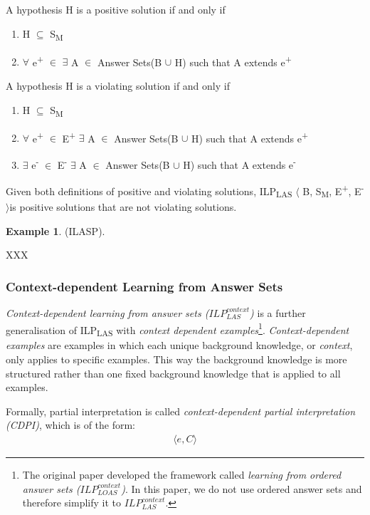 \documentclass[11pt,twoside]{report}
\theoremstyle{plain}
\theoremstyle{definition}
\newtheorem{examp}{Example}[section]
\begin{document}
A hypothesis H is a positive solution if and only if
\begin{enumerate}
\item H $\subseteq$ S\textsubscript{M}
\item $\forall$ e\textsuperscript{+} $\in$ $\exists$ A $\in$ Answer Sets(B $\cup$ H) such that A extends e\textsuperscript{+}
\end{enumerate}
A hypothesis H is a violating solution if and only if
\begin{enumerate}
\item H $\subseteq$ S\textsubscript{M}
\item $\forall$ e\textsuperscript{+} $\in$ E\textsuperscript{+} $\exists$ A $\in$ Answer Sets(B $\cup$ H) such that A extends e\textsuperscript{+}
\item $\exists$ e\textsuperscript{-} $\in$ E\textsuperscript{-} $\exists$ A $\in$ Answer Sets(B $\cup$ H) such that A extends e\textsuperscript{-}\\
\end{enumerate}

Given both definitions of positive and violating solutions, ILP\textsubscript{LAS} $\langle$ B, S\textsubscript{M}, E\textsuperscript{+}, E\textsuperscript{-} $\rangle$is positive solutions that are not violating solutions.

\begin{examp} \normalfont (ILASP).

XXX
\end{examp}

\subsubsection{Context-dependent Learning from Answer Sets }
\textit{Context-dependent learning from answer sets ($ILP_{LAS}^{context}$)} is a further generalisation of ILP\textsubscript{LAS} with \textit{context dependent examples}\cite{Law2016}\footnote{The original paper developed the framework called \textit{learning from ordered answer sets ($ILP_{LOAS}^{context}$)}. 
In this paper, we do not use ordered answer sets and therefore simplify it to $ILP_{LAS}^{context}$. }.
\textit{Context-dependent examples} are examples in which each unique background knowledge, or \textit{context}, only applies to specific examples. 
This way the background knowledge is more structured rather than one fixed background knowledge that is applied to all examples.

Formally, partial interpretation is called \textit{context-dependent partial interpretation (CDPI)}, which is of the form:
\begin{equation} \label{eq:cdpi}
\begin{split}
\langle e, C \rangle
\end{split}
\end{equation}
\end{document}
